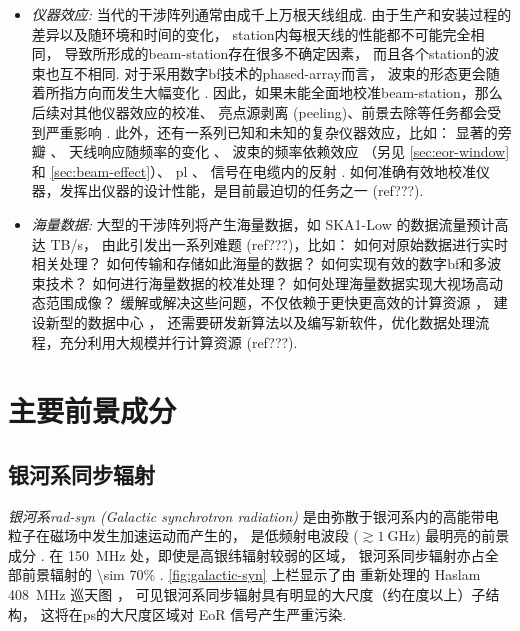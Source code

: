 \begin{itemize}
\item
\emph{仪器效应:}
当代的干涉阵列通常由成千上万根天线组成. 由于生产和安装过程的差异以及随环境和时间的变化，
\ac{station}内每根天线的性能都不可能完全相同，
导致所形成的\ac{beam-station}存在很多不确定因素，
而且各个\ac{station}的波束也互不相同.
对于采用数字\ac{bf}技术的\ac{phased-array}而言，
波束的形态更会随着所指方向而发生大幅变化
\cite{smirnov2011iii,vanWeeren2016,jagannathan2017}.
因此，如果未能全面地校准\ac{beam-station}，那么后续对其他仪器效应的校准、
亮点源剥离 (peeling)、前景去除等任务都会受到严重影响 \cite{noordam2004,neben2016}.
此外，还有一系列已知和未知的复杂仪器效应，比如：
显著的旁瓣 \cite{thyagarajan2015,mort2017}、
天线响应随频率的变化 \cite{bernardi2015,trott2017}、
波束的频率依赖效应 \cite{liu2009ps,datta2010,morales2012}
（另见 \autoref{sec:eor-window} 和 \autoref{sec:beam-effect}）、
\ac{pl} \cite{asad2015,asad2016,asad2018,lenc2017}、
信号在电缆内的反射 \cite{beardsley2016}.
如何准确有效地校准仪器，发挥出仪器的设计性能，是目前最迫切的任务之一
\cite{noordam2004,wijnholds2010} (ref???).

\item
\emph{海量数据:}
大型的干涉阵列将产生海量数据，如 SKA1-Low 的数据流量预计高达 TB/s，
由此引发出一系列难题 \cite{norris2011} (ref???)，比如：
如何对原始数据进行实时相关处理？
如何传输和存储如此海量的数据？
如何实现有效的数字\ac{bf}和多波束技术？
如何进行海量数据的校准处理？
如何处理海量数据实现大视场高动态范围成像？
缓解或解决这些问题，不仅依赖于更快更高效的计算资源 \cite{magro2014,vermij2017}，
建设新型的数据中心 \cite{chrysostomou2018}，
还需要研发新算法以及编写新软件，优化数据处理流程，充分利用大规模并行计算资源
\cite{morales2009,gunst2018} (ref???).

\end{itemize}


\section{主要前景成分}
\label{sec:fg-intro}

\subsection{银河系同步辐射}

\emph{银河系\acs{rad-syn} (Galactic synchrotron radiation)}
是由弥散于银河系内的高能带电粒子在磁场中发生加速运动而产生的，
是低频射电波段 ($\gtrsim \SI{1}{\GHz}$) 最明亮的前景成分
\cite{bernardi2009,ghosh2012}.
在 \SI{150}{\MHz} 处，即使是高银纬辐射较弱的区域，
银河系同步辐射亦占全部前景辐射的 \num{\sim 70}\% \cite{shaver1999}.
\autoref{fig:galactic-syn} 上栏显示了由 
重新处理的 Haslam \SI{408}{\MHz} 巡天图 \cite{haslam1982}，
可见银河系同步辐射具有明显的大尺度（约在度以上）子结构，
这将在\ac{ps}的大尺度区域对 EoR 信号产生严重污染.

